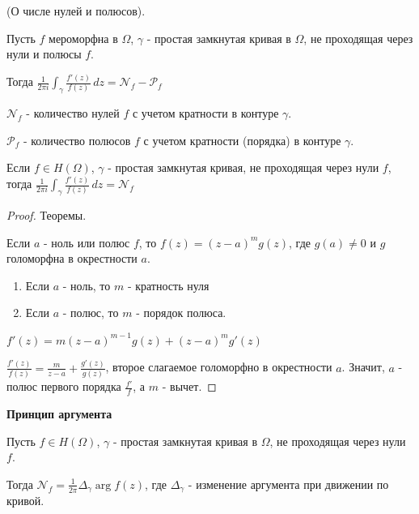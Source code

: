 \begin{theorem} (О числе нулей и полюсов).

    Пусть $f$ мероморфна в $\Omega$, $\gamma$ - простая замкнутая кривая в $\Omega$, 
    не проходящая через нули и полюсы $f$.

    Тогда $\frac{1}{2 \pi i} \int_{\gamma} \frac{f'(z)}{f(z)} \, dz = \mathcal{N}_f - \mathcal{P}_f$

    $\mathcal{N}_f$ - количество нулей $f$ с учетом кратности в контуре $\gamma$.

    $\mathcal{P}_f$ - количество полюсов $f$ с учетом кратности (порядка) в контуре $\gamma$.

    \begin{consequence}
        Если $f \in H(\Omega)$, $\gamma$ - простая замкнутая кривая, не проходящая через нули $f$, тогда
        $\frac{1}{2\pi i} \int_{\gamma} \frac{f'(z)}{f(z)} \, dz = \mathcal{N}_f$
    \end{consequence}
\end{theorem}

\begin{proof} Теоремы.

    Если $a$ - ноль или полюс $f$, то $f(z) = (z - a)^m g(z)$, где $g(a) \neq 0$ и 
    $g$ голоморфна в окрестности $a$.

    \begin{enumerate}
        \item Если $a$ - ноль, то $m$ - кратность нуля
        \item Если $a$ - полюс, то $m$ - порядок полюса.
    \end{enumerate}

    $f'(z) = m(z - a)^{m - 1} g(z) + (z - a)^m g'(z)$

    $\frac{f'(z)}{f(z)} = \frac{m}{z - a} + \frac{g'(z)}{g(z)}$, второе слагаемое голоморфно в окрестности $a$. Значит,
    $a$ - полюс первого порядка $\frac{f'}{f}$, а $m$ - вычет.
\end{proof}

\begin{consequence}
    \textbf{Принцип аргумента}

    Пусть $f \in H(\Omega)$, $\gamma$ - простая замкнутая кривая в $\Omega$, не проходящая через
    нули $f$. 
    
    Тогда $\mathcal{N}_f = \frac{1}{2\pi} \Delta_{\gamma} \arg f(z)$, где $\Delta_{\gamma}$ - изменение аргумента
    при движении по кривой.
\end{consequence}

